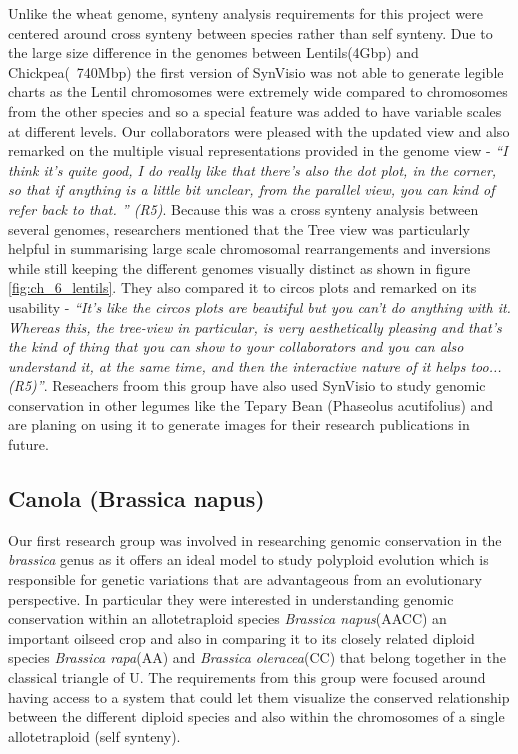 Unlike the wheat genome, synteny analysis requirements for this project were centered around cross synteny between species rather than self synteny. Due to the large size difference in the genomes between Lentils(4Gbp) and Chickpea(~740Mbp) the first version of SynVisio was not able to generate legible charts as the Lentil chromosomes were extremely wide compared to chromosomes from the other species and so a special feature was added to have variable scales at different levels. Our collaborators were pleased with the updated view and also remarked on the multiple visual representations provided in the genome view - \textit{``I think it's quite good, I do really like that there's also the dot plot, in the corner, so that if anything is a little bit unclear, from the parallel view, you can kind of refer back to that.
'' (R5)}. Because this was a cross synteny analysis between several genomes, researchers mentioned that the Tree view was particularly helpful in summarising large scale chromosomal rearrangements and inversions while still keeping the different genomes visually distinct as shown in figure \ref{fig:ch_6_lentils}. They also compared it to circos plots and remarked on its usability - \textit{``It's like the circos plots are beautiful but you can't do anything with it. Whereas this, the tree-view in particular, is very aesthetically pleasing and that's the kind of thing that you can show to your collaborators and you can also understand it, at the same time, and then the interactive nature of it helps too...
(R5)''}. Reseachers froom this group have also used SynVisio to study genomic conservation in other legumes like the Tepary Bean (Phaseolus acutifolius) and are planing on using it to generate images for their research publications in future.

\subsection{Canola (Brassica napus)}


Our first research group was involved in researching genomic conservation in the \textit{brassica} genus as it offers an ideal model to study polyploid evolution which is responsible for genetic variations that are advantageous from an evolutionary perspective\cite{madlung2013polyploidy,liu2014brassica}. In particular they were interested in understanding genomic conservation within an allotetraploid species \textit{Brassica napus}(AACC) an important oilseed crop and also in comparing it to its closely related diploid species \textit{Brassica rapa}(AA) and \textit{Brassica oleracea}(CC) that belong together in the classical triangle of U\cite{nagaharu1935genome}. The requirements from this group were focused around having access to a system that could let them visualize the conserved relationship between the different diploid species and also within the chromosomes of a single allotetraploid (self synteny).

